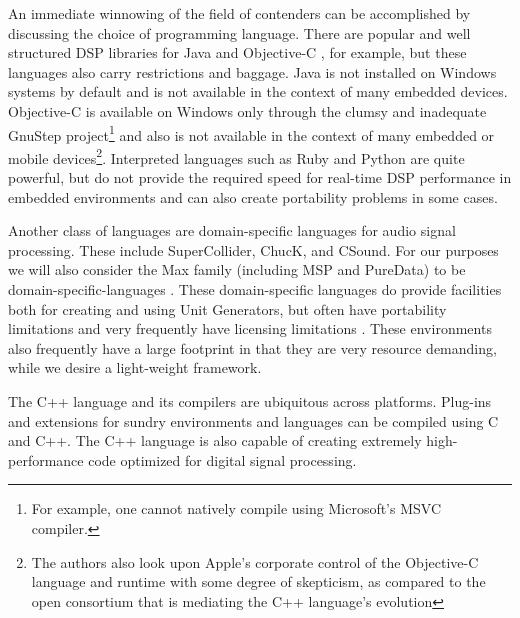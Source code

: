 \documentclass[twoside,10pt]{article}
\begin{document}
An immediate winnowing of the field of contenders can be accomplished by discussing the choice of programming language.  There are popular and well structured DSP libraries for Java \cite{Guillemard:2005, Burk:1998} and Objective-C \cite{Jaffe:1989,Jaffe:1991}, for example, but these languages also carry restrictions and baggage.  Java is not installed on Windows systems by default and is not available in the context of many embedded devices.  Objective-C is available on Windows only through the clumsy and inadequate GnuStep %
  project\footnote{For example, one cannot natively compile using Microsoft's MSVC compiler.} \cite{web3} and also is not available in the context of many embedded or mobile devices\footnote{The authors also look upon Apple's corporate control of the Objective-C language and runtime with some degree of skepticism, as compared to the open consortium that is mediating the C++ language's evolution}.  Interpreted languages such as Ruby and Python are quite powerful, but do not provide the required speed for real-time DSP performance in embedded environments and can also create portability problems in some cases. %

Another class of languages are domain-specific languages for audio signal processing.  These include SuperCollider\cite{McCartney:1996}, ChucK\cite{wang:2008}, and CSound.  For our purposes we will also consider the Max family (including MSP\cite{Zicarelli:1998} and PureData\cite{Puckette:1996}) to be domain-specific-languages
.  
These domain-specific languages do provide facilities both for creating and using Unit Generators, but often have portability limitations and very frequently have licensing limitations
.  
These environments also frequently have a large footprint in that they are very resource demanding, while we desire a light-weight framework.

The C++ language and its compilers are ubiquitous across platforms.  Plug-ins and extensions for sundry environments and languages can be compiled using C and C++.  The C++ language is also capable of creating extremely high-performance code optimized for digital signal processing.
\end{document}
